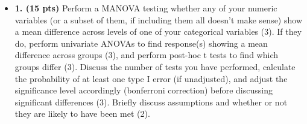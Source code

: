 \documentclass[]{article}
\newenvironment{Shaded}{\begin{snugshade}}{\end{snugshade}}
\newcommand{\CommentTok}[1]{\textcolor[rgb]{0.56,0.35,0.01}{\textit{#1}}}
\newcommand{\DataTypeTok}[1]{\textcolor[rgb]{0.13,0.29,0.53}{#1}}
\newcommand{\KeywordTok}[1]{\textcolor[rgb]{0.13,0.29,0.53}{\textbf{#1}}}
\newcommand{\NormalTok}[1]{#1}
\newcommand{\OperatorTok}[1]{\textcolor[rgb]{0.81,0.36,0.00}{\textbf{#1}}}
\newcommand{\StringTok}[1]{\textcolor[rgb]{0.31,0.60,0.02}{#1}}
\providecommand{\tightlist}{%
  \setlength{\itemsep}{0pt}\setlength{\parskip}{0pt}}
\begin{document}
\begin{Shaded}
\end{Shaded}

\begin{itemize}
\tightlist
\item
  \textbf{1. (15 pts)} Perform a MANOVA testing whether any of your
  numeric variables (or a subset of them, if including them all doesn't
  make sense) show a mean difference across levels of one of your
  categorical variables (3). If they do, perform univariate ANOVAs to
  find response(s) showing a mean difference across groups (3), and
  perform post-hoc t tests to find which groups differ (3). Discuss the
  number of tests you have performed, calculate the probability of at
  least one type I error (if unadjusted), and adjust the significance
  level accordingly (bonferroni correction) before discussing
  significant differences (3). Briefly discuss assumptions and whether
  or not they are likely to have been met (2).
\end{itemize}
\end{document}
